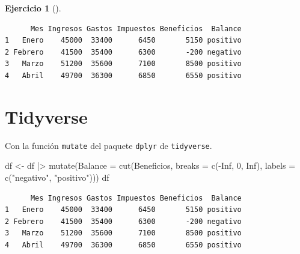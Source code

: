 \documentclass[
  a4paper,
]{scrreport}
\newenvironment{Shaded}{\begin{snugshade}}{\end{snugshade}}
\newcommand{\AttributeTok}[1]{\textcolor[rgb]{0.40,0.45,0.13}{#1}}
\newcommand{\ConstantTok}[1]{\textcolor[rgb]{0.56,0.35,0.01}{#1}}
\newcommand{\DecValTok}[1]{\textcolor[rgb]{0.68,0.00,0.00}{#1}}
\newcommand{\FunctionTok}[1]{\textcolor[rgb]{0.28,0.35,0.67}{#1}}
\newcommand{\NormalTok}[1]{\textcolor[rgb]{0.00,0.23,0.31}{#1}}
\newcommand{\OtherTok}[1]{\textcolor[rgb]{0.00,0.23,0.31}{#1}}
\newcommand{\SpecialCharTok}[1]{\textcolor[rgb]{0.37,0.37,0.37}{#1}}
\newcommand{\StringTok}[1]{\textcolor[rgb]{0.13,0.47,0.30}{#1}}
\theoremstyle{definition}
\newtheorem{exercise}{Ejercicio}[chapter]
\theoremstyle{remark}
\begin{document}
\begin{exercise}[]
\begin{enumerate}
\begin{tcolorbox}
\begin{Shaded}
\end{Shaded}

\begin{verbatim}
      Mes Ingresos Gastos Impuestos Beneficios  Balance
1   Enero    45000  33400      6450       5150 positivo
2 Febrero    41500  35400      6300       -200 negativo
3   Marzo    51200  35600      7100       8500 positivo
4   Abril    49700  36300      6850       6550 positivo
\end{verbatim}

  \section{Tidyverse}

  Con la función \texttt{mutate} del paquete \texttt{dplyr} de
  \texttt{tidyverse}.

\begin{Shaded}
\begin{Highlighting}[]
\NormalTok{df }\OtherTok{\textless{}{-}}\NormalTok{ df }\SpecialCharTok{|\textgreater{}}
    \FunctionTok{mutate}\NormalTok{(}\AttributeTok{Balance =} \FunctionTok{cut}\NormalTok{(Beneficios, }\AttributeTok{breaks =} \FunctionTok{c}\NormalTok{(}\SpecialCharTok{{-}}\ConstantTok{Inf}\NormalTok{, }\DecValTok{0}\NormalTok{, }\ConstantTok{Inf}\NormalTok{), }\AttributeTok{labels =} \FunctionTok{c}\NormalTok{(}\StringTok{"negativo"}\NormalTok{, }\StringTok{"positivo"}\NormalTok{)))}
\NormalTok{df}
\end{Highlighting}
\end{Shaded}

\begin{verbatim}
      Mes Ingresos Gastos Impuestos Beneficios  Balance
1   Enero    45000  33400      6450       5150 positivo
2 Febrero    41500  35400      6300       -200 negativo
3   Marzo    51200  35600      7100       8500 positivo
4   Abril    49700  36300      6850       6550 positivo
\end{verbatim}


\end{tcolorbox}
\end{enumerate}
\end{exercise}
\end{document}
